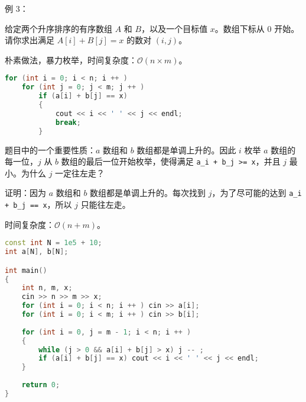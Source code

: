 例 $3$：

给定两个升序排序的有序数组 $A$ 和 $B$，以及一个目标值 $x$。数组下标从 $0$ 开始。请你求出满足 $A[i] + B[j] = x$ 的数对 $(i, j)$。

朴素做法，暴力枚举，时间复杂度：$\mathcal{O}(n \times m)$。

\begin{lstlisting}[language=cpp]
for (int i = 0; i < n; i ++ )   
    for (int j = 0; j < m; j ++ )
        if (a[i] + b[j] == x)
        {
            cout << i << ' ' << j << endl; 
            break;
        }
\end{lstlisting}

题目中的一个重要性质：$a$ 数组和 $b$ 数组都是单调上升的。因此 $i$ 枚举 $a$ 数组的每一位，$j$ 从 $b$ 数组的最后一位开始枚举，使得满足 \verb|a_i + b_j >= x|，并且 $j$ 最小。为什么 $j$ 一定往左走？

证明：因为 $a$ 数组和 $b$ 数组都是单调上升的。每次找到 $j$，为了尽可能的达到 \verb|a_i + b_j == x|，所以 $j$ 只能往左走。

时间复杂度：$\mathcal{O}(n + m)$。

\begin{lstlisting}[language=cpp]
const int N = 1e5 + 10;
int a[N], b[N];

int main()
{
    int n, m, x;
    cin >> n >> m >> x;
    for (int i = 0; i < n; i ++ ) cin >> a[i];
    for (int i = 0; i < m; i ++ ) cin >> b[i];
    
    for (int i = 0, j = m - 1; i < n; i ++ )
    {
        while (j > 0 && a[i] + b[j] > x) j -- ;
        if (a[i] + b[j] == x) cout << i << ' ' << j << endl;
    }
    
    return 0;
}
\end{lstlisting}
